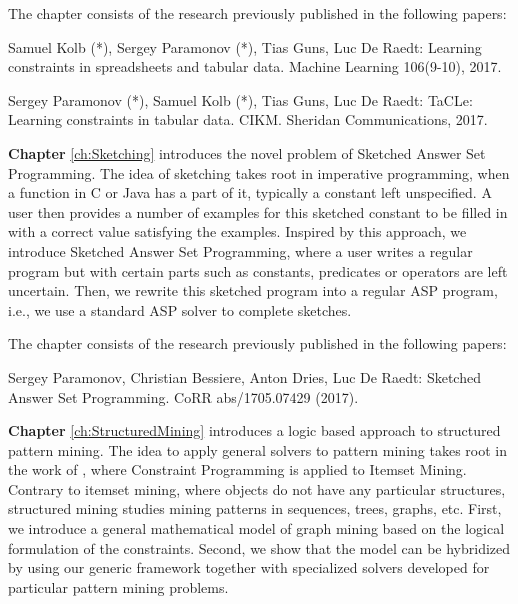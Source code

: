 The chapter consists of the research previously published in the following papers:

\begin{addmargin}[2em]{2em}
Samuel Kolb (*), Sergey Paramonov (*), Tias Guns, Luc De Raedt:
  Learning constraints in spreadsheets and tabular data. Machine
  Learning 106(9-10), 2017.


Sergey Paramonov (*), Samuel Kolb (*), Tias Guns, Luc De Raedt:
TaCLe: Learning constraints in tabular data. CIKM. Sheridan
Communications, 2017.
\end{addmargin}


\textbf{Chapter} \ref{ch:Sketching} introduces the novel problem of
Sketched Answer Set Programming. The idea of sketching takes root in
imperative programming, when a function in C or Java has a part of it,
typically a constant left unspecified. A user then provides a number
of examples for this sketched constant to be filled in with a
correct value satisfying the examples. Inspired by this approach, we
introduce Sketched Answer Set Programming, where a user writes a
regular program but with certain parts such as constants, predicates
or operators are left uncertain. Then, we rewrite this sketched
program into a regular ASP program, i.e., we use a standard ASP solver
to complete sketches.


The chapter consists of the research previously published in the following papers:
\begin{addmargin}[2em]{2em}
  Sergey Paramonov, Christian Bessiere, Anton Dries, Luc De Raedt:
  Sketched Answer Set Programming. CoRR abs/1705.07429 (2017).
\end{addmargin}


\textbf{Chapter} \ref{ch:StructuredMining} introduces a logic
based approach to structured pattern mining. The idea to apply general
solvers to pattern mining takes root in the work of
\cite{declrativeapproach}, where Constraint Programming is applied to
Itemset Mining. Contrary to itemset mining, where objects do not have
any particular structures, structured mining studies mining patterns
in sequences, trees, graphs, etc. First, we introduce a general
mathematical model of graph mining based on the logical formulation of
the constraints. Second, we show that the model can be hybridized by
using our generic framework together with specialized solvers
developed for particular pattern mining problems.

